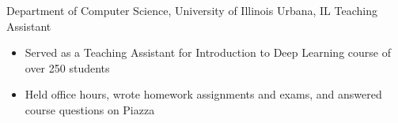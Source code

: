 
        {Department of Computer Science, University of Illinois}
        {Urbana, IL}
        {Teaching Assistant}
        {}{
    \begin{itemize}
        \item Served as a Teaching Assistant for Introduction to Deep Learning course of over 250 students
        \item Held office hours, wrote homework assignments and exams, and answered course questions on Piazza
    \end{itemize}
}
